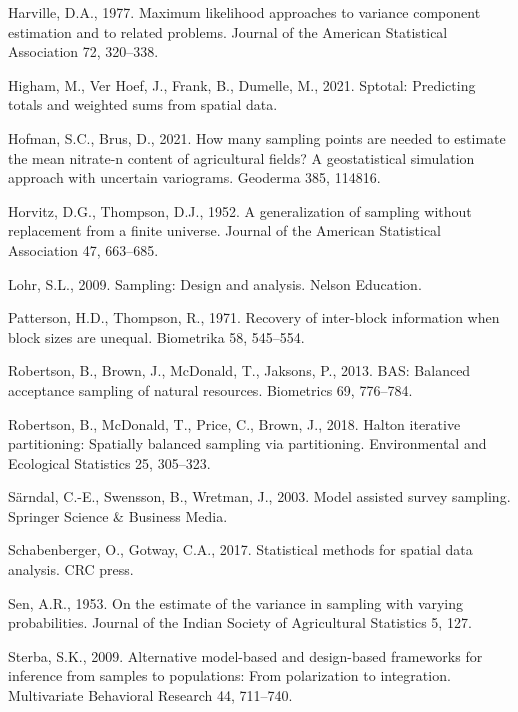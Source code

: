 \documentclass[]{elsarticle} %
\begin{document}
\leavevmode\hypertarget{ref-harville1977maximum}{}%
Harville, D.A., 1977. Maximum likelihood approaches to variance
component estimation and to related problems. Journal of the American
Statistical Association 72, 320--338.

\leavevmode\hypertarget{ref-higham2021sptotal}{}%
Higham, M., Ver Hoef, J., Frank, B., Dumelle, M., 2021. Sptotal:
Predicting totals and weighted sums from spatial data.

\leavevmode\hypertarget{ref-hofman2021many}{}%
Hofman, S.C., Brus, D., 2021. How many sampling points are needed to
estimate the mean nitrate-n content of agricultural fields? A
geostatistical simulation approach with uncertain variograms. Geoderma
385, 114816.

\leavevmode\hypertarget{ref-horvitz1952generalization}{}%
Horvitz, D.G., Thompson, D.J., 1952. A generalization of sampling
without replacement from a finite universe. Journal of the American
Statistical Association 47, 663--685.

\leavevmode\hypertarget{ref-lohr2009sampling}{}%
Lohr, S.L., 2009. Sampling: Design and analysis. Nelson Education.

\leavevmode\hypertarget{ref-patterson1971recovery}{}%
Patterson, H.D., Thompson, R., 1971. Recovery of inter-block information
when block sizes are unequal. Biometrika 58, 545--554.

\leavevmode\hypertarget{ref-robertson2013bas}{}%
Robertson, B., Brown, J., McDonald, T., Jaksons, P., 2013. BAS: Balanced
acceptance sampling of natural resources. Biometrics 69, 776--784.

\leavevmode\hypertarget{ref-robertson2018halton}{}%
Robertson, B., McDonald, T., Price, C., Brown, J., 2018. Halton
iterative partitioning: Spatially balanced sampling via partitioning.
Environmental and Ecological Statistics 25, 305--323.

\leavevmode\hypertarget{ref-sarndal2003model}{}%
Särndal, C.-E., Swensson, B., Wretman, J., 2003. Model assisted survey
sampling. Springer Science \& Business Media.

\leavevmode\hypertarget{ref-schabenberger2017statistical}{}%
Schabenberger, O., Gotway, C.A., 2017. Statistical methods for spatial
data analysis. CRC press.

\leavevmode\hypertarget{ref-sen1953estimate}{}%
Sen, A.R., 1953. On the estimate of the variance in sampling with
varying probabilities. Journal of the Indian Society of Agricultural
Statistics 5, 127.

\leavevmode\hypertarget{ref-sterba2009alternative}{}%
Sterba, S.K., 2009. Alternative model-based and design-based frameworks
for inference from samples to populations: From polarization to
integration. Multivariate Behavioral Research 44, 711--740.
\end{document}
